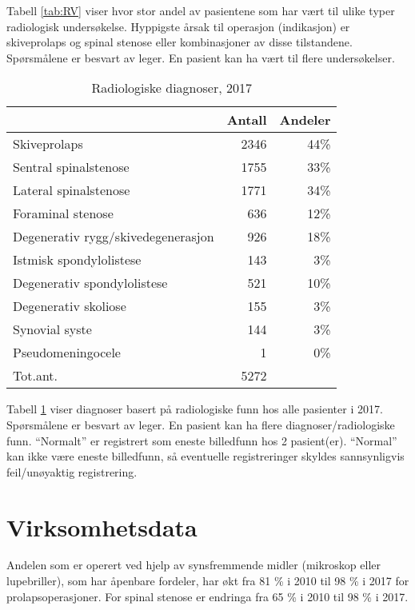 \documentclass [norsk,a4paper,twoside]{article}\usepackage[]{graphicx}\usepackage[]{color}
\begin{document}
Tabell \ref{tab:RV} viser hvor stor andel av pasientene som har vært til ulike typer 
radiologisk undersøkelse. Hyppigste årsak til operasjon (indikasjon) er skiveprolaps og spinal stenose eller kombinasjoner av disse tilstandene.
Spørsmålene er besvart av leger. En pasient kan ha vært til flere undersøkelser.




\begin{table}[ht]
\centering
\begin{tabular}{lrr}
  \hline
 & Antall & Andeler \\ 
  \hline
Skiveprolaps & 2346 & 44\% \\ 
  Sentral spinalstenose & 1755 & 33\% \\ 
  Lateral spinalstenose & 1771 & 34\% \\ 
  Foraminal stenose & 636 & 12\% \\ 
  Degenerativ rygg/skivedegenerasjon & 926 & 18\% \\ 
  Istmisk spondylolistese & 143 & 3\% \\ 
  Degenerativ spondylolistese & 521 & 10\% \\ 
  Degenerativ skoliose & 155 & 3\% \\ 
  Synovial syste & 144 & 3\% \\ 
  Pseudomeningocele & 1 & 0\% \\ 
  Tot.ant. & 5272 &   \\ 
   \hline
\end{tabular}
\caption{Radiologiske diagnoser, 2017} 
\label{tab:RF}
\end{table}


Tabell \ref{tab:RF} viser diagnoser basert på radiologiske funn hos alle pasienter 
i 2017. 
Spørsmålene er besvart av leger.
En pasient kan ha flere diagnoser/radiologiske funn.
``Normalt'' er registrert som eneste billedfunn hos 2 pasient(er). ``Normal'' kan ikke være eneste billedfunn, 
                        så eventuelle registreringer skyldes sannsynligvis 
                                  feil/unøyaktig registrering.




\section{Virksomhetsdata}


Andelen som er operert ved hjelp av synsfremmende midler (mikroskop eller
lupebriller), som har åpenbare fordeler, har økt fra 81 \% i 2010 til 
98 \% i 2017 for prolapsoperasjoner. For spinal stenose er endringa fra 65 \% i 2010 til 
98 \% i 2017.
\end{document}
